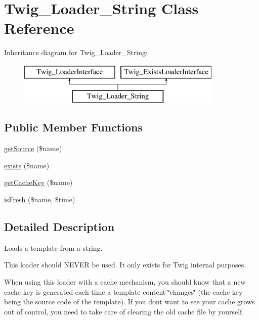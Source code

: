 \hypertarget{classTwig__Loader__String}{}\section{Twig\+\_\+\+Loader\+\_\+\+String Class Reference}
\label{classTwig__Loader__String}
Inheritance diagram for Twig\+\_\+\+Loader\+\_\+\+String\+:\begin{figure}[H]
\begin{center}
\leavevmode
\includegraphics[height=2.000000cm]{classTwig__Loader__String}
\end{center}
\end{figure}
\subsection*{Public Member Functions}
\begin{DoxyCompactItemize}
\item 
\hyperlink{classTwig__Loader__String_ad3d3027d735582927a7ab1a4429df84a}{get\+Source} (\$name)
\item 
\hyperlink{classTwig__Loader__String_aa8e6692f8e9a397ff421ec01efaff911}{exists} (\$name)
\item 
\hyperlink{classTwig__Loader__String_a33907b2a79f1d15640e00fc524925eb6}{get\+Cache\+Key} (\$name)
\item 
\hyperlink{classTwig__Loader__String_ab77f72cf673352c333a8aaf9df3714f2}{is\+Fresh} (\$name, \$time)
\end{DoxyCompactItemize}


\subsection{Detailed Description}
Loads a template from a string.

This loader should N\+E\+V\+ER be used. It only exists for Twig internal purposes.

When using this loader with a cache mechanism, you should know that a new cache key is generated each time a template content \char`\"{}changes\char`\"{} (the cache key being the source code of the template). If you don\textquotesingle{}t want to see your cache grows out of control, you need to take care of clearing the old cache file by yourself.

